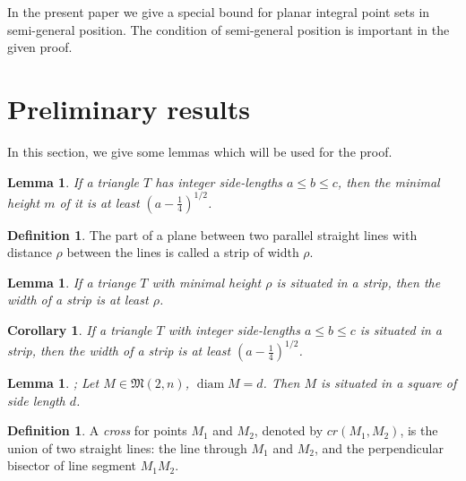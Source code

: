 \documentclass[a4paper,14pt]{article} %
\theoremstyle{plain}
\newtheorem{lemma}[theorem]{Lemma}
\newtheorem{corollary}[theorem]{Corollary}
\theoremstyle{definition}
\newtheorem{definition}[theorem]{Definition}
\begin{document}
In the present paper we give a special bound for planar integral point sets in semi-general position.
The condition of semi-general position is important in the given proof.



\section{Preliminary results}

In this section, we give some lemmas which will be used for the proof.


\begin{lemma}
	\cite[Observation 1]{solymosi2003note}
	If a triangle $T$ has integer side-lengths $a \leq b \leq c$,
	then the minimal height $m$ of it is at least $\left(a - \frac{1}{4}\right)^{1/2}$.
\end{lemma}

\begin{definition}
	The part of a plane between two parallel straight lines with distance $\rho$ between the lines
	is called a strip of width $\rho$.
\end{definition}

\begin{lemma}
	\cite{smurov1998stripcoverings}
	If a triange $T$ with minimal height $\rho$ is situated in a strip,
	then the width of a strip is at least $\rho$.
\end{lemma}

\begin{corollary}
	\label{cor:solymosi_strip}
	If a triangle $T$ with integer side-lengths $a \leq b \leq c$ is situated in a strip,
	then the width of a strip is at least $\left(a - \frac{1}{4}\right)^{1/2}$.
\end{corollary}


\begin{lemma}
	\cite[Lemma 4]{our-vmmsh-2018};
	\cite[Lemma 2.4]{my-pps-linear-bound-2019}
	\label{lem:square_container}
	Let $M\in\mathfrak{M}(2,n)$, $\operatorname{diam} M = d$.
	Then $M$ is situated in a square of side length $d$.
\end{lemma}

\begin{definition}
	\cite[Definition 2.5]{my-pps-linear-bound-2019}
	A \textit{cross} for points $M_1$ and $M_2$, denoted by $cr(M_1,M_2)$, is the union of two straight lines:
	the line through $M_1$ and $M_2$,
	and the perpendicular bisector of line segment $M_1 M_2$.
\end{definition}
\end{document}
